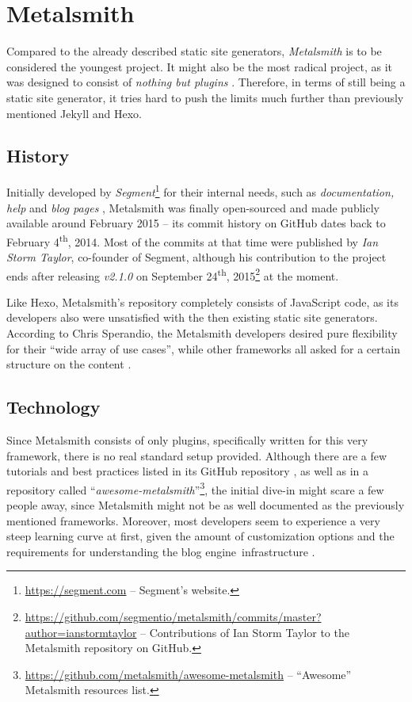 \section{Metalsmith}
\label{sec:metalsmith}

Compared to the already described static site generators, \emph{Metalsmith} is to be considered the youngest project.
It might also be the most radical project, as it was designed to consist of \emph{nothing but plugins} \cite[31]{dhillon2016}. Therefore, in terms of still being a static site generator, it tries hard to push the limits much further than previously mentioned Jekyll and Hexo.

\subsection{History}
\label{sec:metalsmith-history}
Initially developed by \emph{Segment}\footnote{\url{https://segment.com} -- Segment's website.} for their internal needs, such as \emph{documentation, help} and \emph{blog pages} \cite{Metalsmith2015buildingblocks}, Metalsmith was finally open-sourced and made publicly available around February 2015 -- its commit history on GitHub dates back to February 4\textsuperscript{th}, 2014. Most of the commits at that time were published by \emph{Ian Storm Taylor}, co-founder of Segment, although his contribution to the project ends after releasing \emph{v2.1.0} on September 24\textsuperscript{th}, 2015\footnote{\url{https://github.com/segmentio/metalsmith/commits/master?author=ianstormtaylor} -- Contributions of Ian Storm Taylor to the Metalsmith repository on GitHub.} at the moment.

Like Hexo, Metalsmith's repository completely consists of JavaScript code, as its developers also were unsatisfied with the then existing static site generators. According to Chris Sperandio, the Metalsmith developers desired pure flexibility for their ``wide array of use cases'', while other frameworks all asked for a certain structure on the content \cite{Metalsmith2015buildingblocks}.

\subsection{Technology}
\label{sec:metalsmith-technology}
Since Metalsmith consists of only plugins, specifically written for this very framework, there is no real standard setup provided. Although there are a few tutorials and best practices listed in its GitHub repository \cite{MetalsmithRepository}, as well as in a repository called ``\emph{awesome-metalsmith}''\footnote{\url{https://github.com/metalsmith/awesome-metalsmith} -- ``Awesome'' Metalsmith resources list.}, the initial dive-in might scare a few people away, since Metalsmith might not be as well documented as the previously mentioned frameworks. Moreover, most developers seem to experience a very steep learning curve at first, given the amount of customization options and the requirements for understanding the blog engine~infrastructure \cite[31]{dhillon2016}.

